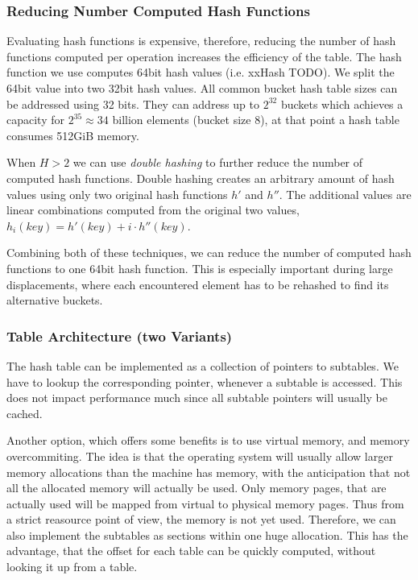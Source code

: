 \documentclass[a4paper,UKenglish]{lipics-v2016}
\begin{document}
\subsubsection*{Reducing Number Computed Hash Functions}
Evaluating hash functions is expensive, therefore, reducing the number
of hash functions computed per operation increases the efficiency of
the table.  The hash function we use computes 64bit hash values
(i.e. xxHash TODO).  We split the 64bit value into two 32bit hash
values. All common bucket hash table sizes can be addressed using 32
bits. They can address up to $2^{32}$ buckets which achieves a
capacity for $2^{35} \approx 34$ billion elements (bucket size 8),
at that point a hash table consumes 512GiB memory.

When $H > 2$ we can use \emph{double hashing} to further reduce the number
of computed hash functions. Double hashing creates an arbitrary amount
of hash values using only two original hash functions $h'$ and
$h''$.  The additional values are linear combinations computed
from the original two values, $h_i(key) = h'(key) + i\cdot
h''(key)$.

Combining both of these techniques, we can reduce the number of
computed hash functions to one 64bit hash function.  This is
especially important during large displacements, where each
encountered element has to be rehashed to find its alternative
buckets.

\subsubsection*{Table Architecture (two Variants)}
\label{sec:dys_inplace}
The hash table can be implemented as a collection of pointers to
subtables. We have to lookup the corresponding pointer, whenever a
subtable is accessed.  This does not impact performance much since all
subtable pointers will usually be cached.

Another option, which offers some benefits is to use virtual memory,
and memory overcommiting.  The idea is that the operating system will
usually allow larger memory allocations than the machine has memory,
with the anticipation that not all the allocated memory will actually
be used.  Only memory pages, that are actually used will be mapped
from virtual to physical memory pages.  Thus from a strict reasource
point of view, the memory is not yet used.  Therefore, we can also
implement the subtables as sections within one huge allocation.  This
has the advantage, that the offset for each table can be quickly
computed, without looking it up from a table.
\end{document}
